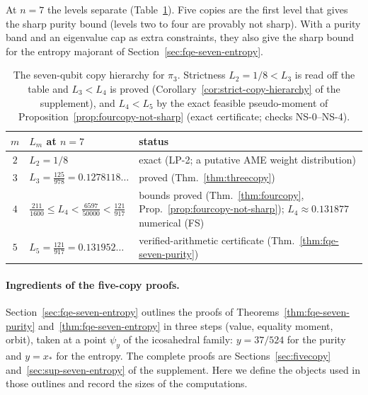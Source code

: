At $n=7$ the levels separate (Table~\ref{tab:fqe-seven-levels}). Five copies are the first level that gives the sharp
purity bound (levels two to four are provably not sharp). With a purity band and an eigenvalue cap as extra constraints, they also give the sharp bound for the entropy majorant of
Section~\ref{sec:fqe-seven-entropy}.
\begin{table}[ht]
\centering\small
\begin{tabular}{@{}cll@{}}
\toprule
$m$ & $L_m$ at $n=7$ & status\\
\midrule
$2$ & $L_2=1/8$ & exact (LP-2; a putative AME weight distribution)\\
$3$ & $L_3=\tfrac{125}{978}=0.1278118\ldots$ & proved (Thm.~\ref{thm:threecopy})\\
$4$ & $\tfrac{211}{1600}\le L_4<\tfrac{6597}{50000}<\tfrac{121}{917}$ & bounds proved (Thm.~\ref{thm:fourcopy}, Prop.~\ref{prop:fourcopy-not-sharp}); $L_4\approx0.131877$ numerical (FS)\\
$5$ & $L_5=\tfrac{121}{917}=0.131952\ldots$ & verified-arithmetic certificate (Thm.~\ref{thm:fqe-seven-purity})\\
\bottomrule
\end{tabular}
\caption{The seven-qubit copy hierarchy for $\pi_3$. Strictness $L_2=1/8<L_3$ is read off the table and $L_3<L_4$ is proved
(Corollary~\ref{cor:strict-copy-hierarchy} of the supplement), and $L_4<L_5$ by the exact feasible pseudo-moment of Proposition~\ref{prop:fourcopy-not-sharp} (exact certificate; checks NS-0--NS-4).}
\label{tab:fqe-seven-levels}
\end{table}

\paragraph{Ingredients of the five-copy proofs.} Section~\ref{sec:fqe-seven-entropy} outlines the proofs of
Theorems~\ref{thm:fqe-seven-purity} and~\ref{thm:fqe-seven-entropy} in three steps (value, equality moment, orbit), taken
at a point $\psi_y$ of the icosahedral family: $y=37/524$ for the purity and $y=x_*$ for the entropy. The complete proofs
are Sections~\ref{sec:fivecopy} and~\ref{sec:sup-seven-entropy} of the supplement. Here we define the objects used in those outlines
and record the sizes of the computations.

